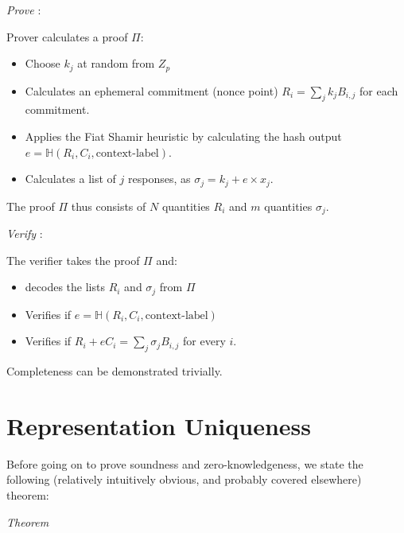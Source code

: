 \documentclass[10pt,a4paper]{article}
\begin{document}
\emph{Prove} :

\vspace{5 pt}

Prover calculates a proof $\Pi$:
\begin{itemize}
\item Choose $k_j$ at random from $Z_p$
\item Calculates an ephemeral commitment (nonce point) $R_i = \sum_j k_j B_{i,j}$ for each commitment.
\item Applies the Fiat Shamir heuristic by calculating the hash output $e = \mathbb{H}(R_i, C_i, \textrm{context-label})$.
\item Calculates a list of $j$ responses, as $\sigma_j = k_j + e \times x_j$.
\end{itemize}

The proof $\Pi$ thus consists of $N$ quantities $R_i$ and $m$ quantities $\sigma_j$.

\vspace{5 pt}

\emph{Verify} :

\vspace{5 pt}

The verifier takes the proof $\Pi$ and:

\begin{itemize}
\item decodes the lists $R_i$ and $\sigma_j$ from $\Pi$
\item Verifies if $e = \mathbb{H}(R_i, C_i, \textrm{context-label})$
\item Verifies if $R_i + eC_i = \sum_j \sigma_j B_{i, j}$ for every $i$.
\end{itemize}

\vspace{5 pt}

Completeness can be demonstrated trivially.

\section{Representation Uniqueness}

Before going on to prove soundness and zero-knowledgeness, we state the following (relatively intuitively obvious, and probably covered elsewhere) theorem:

\vspace{5 pt}

\emph{Theorem}

\vspace{5 pt}
\end{document}
